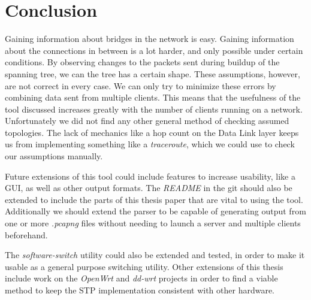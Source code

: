 \chapter*{Conclusion}
Gaining information about bridges in the network is easy.
Gaining information about the connections in between is a lot harder, and only possible under certain conditions.
By observing changes to the packets sent during buildup of the spanning tree, we can the tree has a certain shape.
These assumptions, however, are not correct in every case.
We can only try to minimize these errors by combining data sent from multiple clients.
This means that the usefulness of the tool discussed increases greatly with the number of clients running on a network.
Unfortunately we did not find any other general method of checking assumed topologies.
The lack of mechanics like a hop count on the Data Link layer keeps us from implementing something like a \textit{traceroute}, which we could use to check our assumptions manually.

Future extensions of this tool could include features to increase usability, like a GUI, as well as other output formats.
The \textit{README} in the git should also be extended to include the parts of this thesis paper that are vital to using the tool.
Additionally we should extend the parser to be capable of generating output from one or more \textit{.pcapng} files without needing to launch a server and multiple clients beforehand.
\newline

The \textit{software-switch} utility could also be extended and tested, in order to make it usable as a general purpose switching utility.
Other extensions of this thesis include work on the \textit{OpenWrt} and \textit{dd-wrt} projects in order to find a viable method to keep the STP implementation consistent with other hardware.

